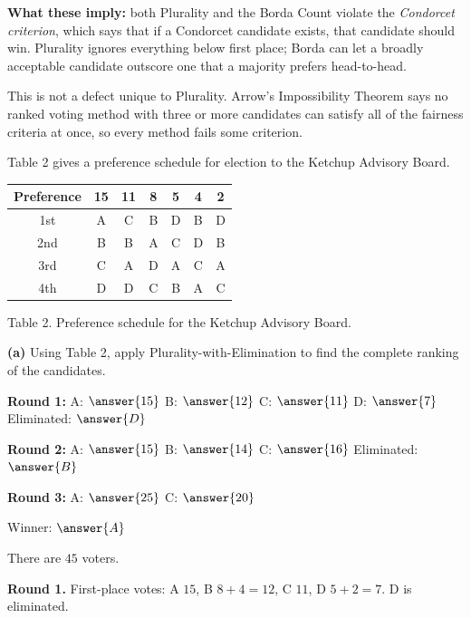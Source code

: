 \documentclass[12pt]{ximera}
\begin{document}
\begin{problem}
\begin{feedback}
\textbf{What these imply:} both Plurality and the Borda Count violate the
\emph{Condorcet criterion}, which says that if a Condorcet candidate exists, that
candidate should win. Plurality ignores everything below first place; Borda can let a
broadly acceptable candidate outscore one that a majority prefers head-to-head.

This is not a defect unique to Plurality. Arrow's Impossibility Theorem says no ranked
voting method with three or more candidates can satisfy all of the fairness criteria
at once, so every method fails some criterion.
\end{feedback}
\end{problem}

\begin{problem}
Table 2 gives a preference schedule for election to the Ketchup Advisory Board.

\begin{center}
\begin{tabular}{c|cccccc}
Preference & 15 & 11 & 8 & 5 & 4 & 2 \\\hline
1st & A & C & B & D & B & D \\
2nd & B & B & A & C & D & B \\
3rd & C & A & D & A & C & A \\
4th & D & D & C & B & A & C
\end{tabular}

\smallskip
Table 2. Preference schedule for the Ketchup Advisory Board.
\end{center}

\begin{prompt}
\textbf{(a)} Using Table 2, apply Plurality-with-Elimination to find the complete
ranking of the candidates.

\textbf{Round 1:} A: $\answer{15}$ \quad B: $\answer{12}$ \quad C: $\answer{11}$ \quad
D: $\answer{7}$ \qquad Eliminated: $\answer{D}$

\smallskip
\textbf{Round 2:} A: $\answer{15}$ \quad B: $\answer{14}$ \quad C: $\answer{16}$
\qquad Eliminated: $\answer{B}$

\smallskip
\textbf{Round 3:} A: $\answer{25}$ \quad C: $\answer{20}$

\smallskip
Winner: $\answer{A}$

\begin{feedback}
There are $45$ voters.

\textbf{Round 1.} First-place votes: A $15$, B $8+4 = 12$, C $11$, D $5+2 = 7$.
D is eliminated.


\end{feedback}
\end{prompt}
\end{problem}
\end{document}
